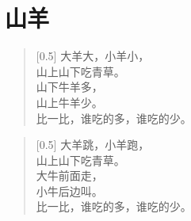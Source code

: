 \documentclass[12pt,UTF-8,openany]{ctexbook}
\begin{document}
\hanzibox{}\hanzibox{}\hanzibox{}\hanzibox{}\hspace{1em}\hanzibox{}\hanzibox{}\hanzibox{}\hanzibox{}

\hanzibox{}\hanzibox{}\hanzibox{}\hanzibox{}\hspace{1em}\hanzibox{}\hanzibox{}\hanzibox{}\hanzibox{}

\hanzibox{}\hanzibox{}\hanzibox{}\hanzibox{}\hspace{1em}\hanzibox{}\hanzibox{}\hanzibox{}\hanzibox{}

\hanzibox{}\hanzibox{}\hanzibox{}\hanzibox{}\hspace{1em}\hanzibox{}\hanzibox{}\hanzibox{}\hanzibox{}






\chapter{山羊}

\begin{large}
    
    \begin{verse}[0.5\linewidth]
        大羊大，小羊小， \\
        山上山下吃青草。 \\
        山下牛羊多， \\
        山上牛羊少。 \\
        比一比，谁吃的多，谁吃的少。
    \end{verse}
    
    
    \begin{verse}[0.5\linewidth]
        大羊跳，小羊跑， \\
        山上山下吃青草。 \\
        大牛前面走， \\
        小牛后边叫。 \\
        比一比，谁吃的多，谁吃的少。
    \end{verse}
    
\end{large}


\clearpage

\begin{center}
    
\end{center}
\end{document}
